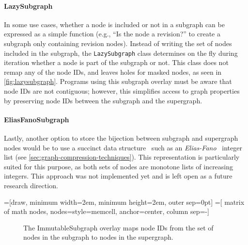 \paragraph{LazySubgraph}
In some use cases, whether a node is included or not in a subgraph can be
expressed as a simple function (e.g., ``Is the node a revision?'' to create a
subgraph only containing revision nodes). Instead of writing the set of nodes
included in the subgraph, the \texttt{LazySubgraph} class determines on the fly
during iteration whether a node is part of the subgraph or not. This class does
not remap any of the node IDs, and leaves holes for masked nodes, as seen in
\cref{fig:lazysubgraph}. Programs using this subgraph overlay must be aware
that node IDs are not contiguous; however, this simplifies access to graph
properties by preserving node IDs between the subgraph and the supergraph.

\paragraph{EliasFanoSubgraph}
Lastly, another option to store the bijection between subgraph and supergraph
nodes would be to use a succinct data structure~\cite{NavCDS}
such as an \emph{Elias-Fano}~\cite{EliESRCASF} integer list (see
\cref{sec:graph-compression-techniques}). This representation is particularly
suited for this purpose, as both sets of nodes are monotone lists of increasing
integers. This approach was not implemented yet and is left open as a future
research direction.

=[draw, minimum width=2em, minimum height=2em, outer sep=0pt]
=[
    matrix of math nodes,
    nodes={style=memcell, anchor=center},
    column sep=-\pgflinewidth]

\begin{figure}
    \centering
    \caption{The ImmutableSubgraph overlay maps node IDs from the set of nodes
    in the subgraph to nodes in the supergraph.}%
    \label{fig:immutablesubgraph}
\end{figure}

